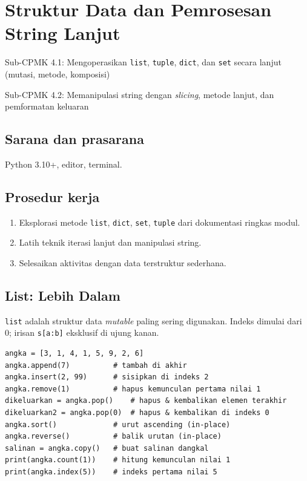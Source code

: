 \documentclass[../main.tex]{subfiles}
\begin{document}
\chapter{Struktur Data dan Pemrosesan String Lanjut}

\begin{subcpmk}
  \item Sub-CPMK 4.1: Mengoperasikan \texttt{list}, \texttt{tuple}, \texttt{dict}, dan \texttt{set} secara lanjut (mutasi, metode, komposisi)
  \item Sub-CPMK 4.2: Memanipulasi string dengan \textit{slicing}, metode lanjut, dan pemformatan keluaran
\end{subcpmk}


\section{Sarana dan prasarana}

Python 3.10+, editor, terminal.

\section{Prosedur kerja}

\begin{enumerate}[leftmargin=*]
  \item Eksplorasi metode \texttt{list}, \texttt{dict}, \texttt{set}, \texttt{tuple} dari dokumentasi ringkas modul.
  \item Latih teknik iterasi lanjut dan manipulasi string.
  \item Selesaikan aktivitas dengan data terstruktur sederhana.
\end{enumerate}

\section{List: Lebih Dalam}

\texttt{list} adalah struktur data \textit{mutable} paling sering digunakan. Indeks dimulai dari 0; irisan \texttt{s[a:b]} eksklusif di ujung kanan.

\begin{lstlisting}[caption=Metode list lengkap (Tutorial Python ss5.1)]
angka = [3, 1, 4, 1, 5, 9, 2, 6]
angka.append(7)          # tambah di akhir
angka.insert(2, 99)      # sisipkan di indeks 2
angka.remove(1)          # hapus kemunculan pertama nilai 1
dikeluarkan = angka.pop()    # hapus & kembalikan elemen terakhir
dikeluarkan2 = angka.pop(0)  # hapus & kembalikan di indeks 0
angka.sort()             # urut ascending (in-place)
angka.reverse()          # balik urutan (in-place)
salinan = angka.copy()   # buat salinan dangkal
print(angka.count(1))    # hitung kemunculan nilai 1
print(angka.index(5))    # indeks pertama nilai 5
\end{lstlisting}
\end{document}
